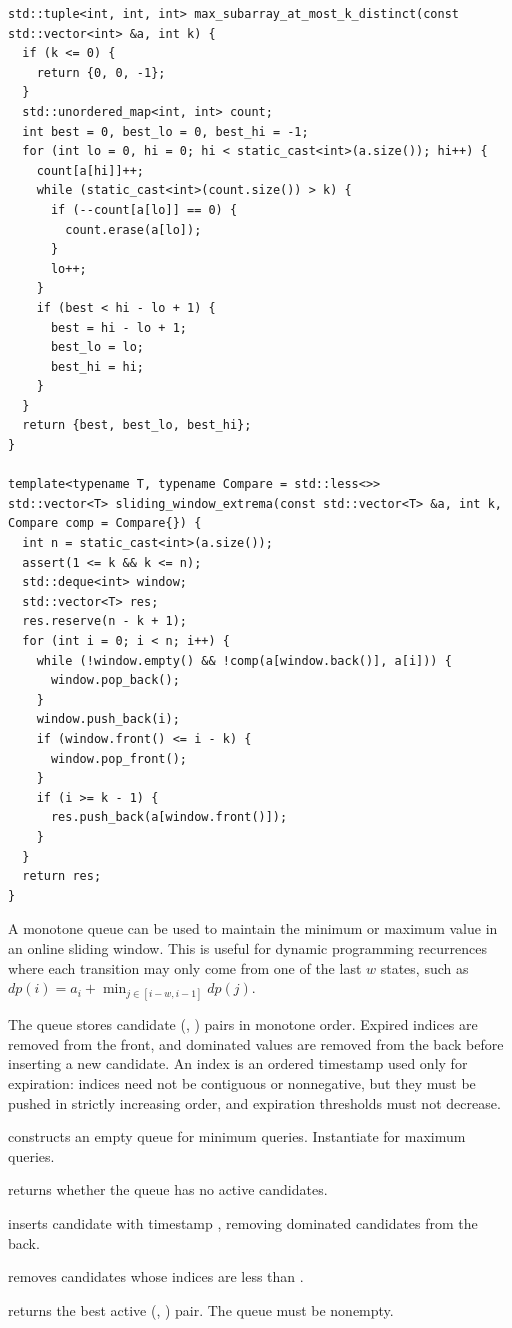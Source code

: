 \begin{lstlisting}[style=cpp]
std::tuple<int, int, int> max_subarray_at_most_k_distinct(const std::vector<int> &a, int k) {
  if (k <= 0) {
    return {0, 0, -1};
  }
  std::unordered_map<int, int> count;
  int best = 0, best_lo = 0, best_hi = -1;
  for (int lo = 0, hi = 0; hi < static_cast<int>(a.size()); hi++) {
    count[a[hi]]++;
    while (static_cast<int>(count.size()) > k) {
      if (--count[a[lo]] == 0) {
        count.erase(a[lo]);
      }
      lo++;
    }
    if (best < hi - lo + 1) {
      best = hi - lo + 1;
      best_lo = lo;
      best_hi = hi;
    }
  }
  return {best, best_lo, best_hi};
}

template<typename T, typename Compare = std::less<>>
std::vector<T> sliding_window_extrema(const std::vector<T> &a, int k, Compare comp = Compare{}) {
  int n = static_cast<int>(a.size());
  assert(1 <= k && k <= n);
  std::deque<int> window;
  std::vector<T> res;
  res.reserve(n - k + 1);
  for (int i = 0; i < n; i++) {
    while (!window.empty() && !comp(a[window.back()], a[i])) {
      window.pop_back();
    }
    window.push_back(i);
    if (window.front() <= i - k) {
      window.pop_front();
    }
    if (i >= k - 1) {
      res.push_back(a[window.front()]);
    }
  }
  return res;
}
\end{lstlisting}
A monotone queue can be used to maintain the minimum or maximum value in an online sliding window. This is useful for dynamic programming recurrences where each transition may only come from one of the last $w$ states, such as $dp(i) = a_i + \min_{j \in [i - w, i - 1]} dp(j)$.

The queue stores candidate (, ) pairs in monotone order. Expired indices are removed from the front, and dominated values are removed from the back before inserting a new candidate. An index is an ordered  timestamp used only for expiration: indices need not be contiguous or nonnegative, but they must be pushed in strictly increasing order, and expiration thresholds must not decrease.

\begin{compactitem}
  \item {} constructs an empty queue for minimum queries. Instantiate  for maximum queries.
  \item {} returns whether the queue has no active candidates.
  \item {} inserts candidate  with timestamp , removing dominated candidates from the back.
  \item {} removes candidates whose indices are less than .
  \item {} returns the best active (, ) pair. The queue must be nonempty.
\end{compactitem}

